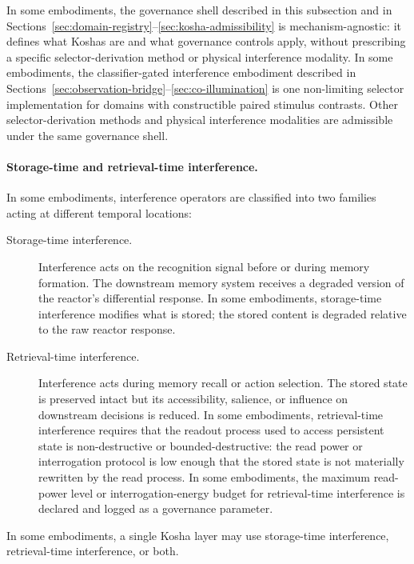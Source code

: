 \documentclass[a4paper,12pt]{article}
\begin{document}
In some embodiments, the governance shell described in this
subsection and in
Sections~\ref{sec:domain-registry}--\ref{sec:kosha-admissibility}
is mechanism-agnostic: it defines what Koshas are and what governance
controls apply, without prescribing a specific selector-derivation
method or physical interference modality. In some embodiments, the
classifier-gated interference embodiment described in
Sections~\ref{sec:observation-bridge}--\ref{sec:co-illumination} is
one non-limiting selector implementation for domains with
constructible paired stimulus contrasts. Other selector-derivation
methods and physical interference modalities are admissible under the
same governance shell.

\paragraph{Storage-time and retrieval-time interference.}
In some embodiments, interference operators are classified into two
families acting at different temporal locations:

\begin{description}
  \item[Storage-time interference.] Interference acts on the
    recognition signal before or during memory formation. The
    downstream memory system receives a degraded version of the
    reactor's differential response. In some embodiments,
    storage-time interference modifies what is stored; the stored
    content is degraded relative to the raw reactor response.
  \item[Retrieval-time interference.] Interference acts during
    memory recall or action selection. The stored state is preserved
    intact but its accessibility, salience, or influence on
    downstream decisions is reduced. In some embodiments,
    retrieval-time interference requires that the readout process
    used to access persistent state is non-destructive or
    bounded-destructive: the read power or interrogation protocol is
    low enough that the stored state is not materially rewritten by
    the read process. In some embodiments, the maximum read-power
    level or interrogation-energy budget for retrieval-time
    interference is declared and logged as a governance parameter.
\end{description}

In some embodiments, a single Kosha layer may use storage-time
interference, retrieval-time interference, or both.

\end{document}
